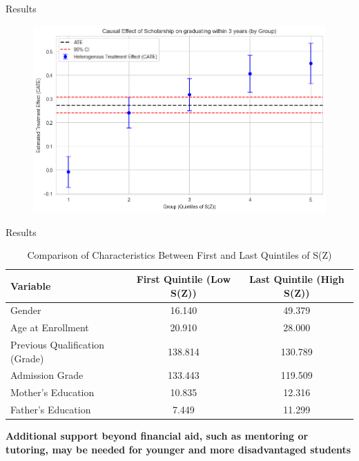 \documentclass[aspectratio=169]{beamer}
\begin{document}
\begin{frame}{Results}

\begin{figure}[h!]  
        \includegraphics[width=0.8\linewidth]{Tex_Pictures/HE_quintile_graduating.png} 

 
 \end{figure}   
\end{frame}



\begin{frame}{Results}
\begin{table}[h]
    \centering
    \begin{tabular}{l c c}
        \hline
        \textbf{Variable} & \textbf{First Quintile (Low S(Z))} & \textbf{Last Quintile (High S(Z))} \\
        \hline
        Gender & 16.140 & 49.379 \\
        Age at Enrollment & 20.910 & 28.000 \\
        Previous Qualification (Grade) & 138.814 & 130.789 \\
        Admission Grade & 133.443 & 119.509 \\
        Mother’s Education & 10.835 & 12.316 \\
        Father’s Education & 7.449 & 11.299 \\
        \hline
    \end{tabular}
    \caption{Comparison of Characteristics Between First and Last Quintiles of S(Z)}
    \label{tab:quintile_comparison_2}
\end{table}



\textbf{Additional support beyond financial aid, such as mentoring or tutoring, may be needed for younger and more disadvantaged students}
\end{frame}
\end{document}
